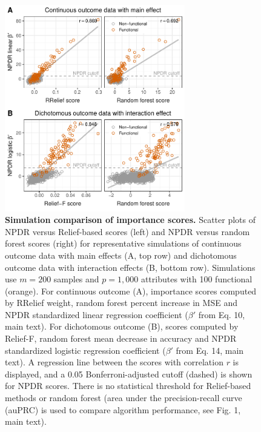 \documentclass{article}
\begin{document}
\begin{figure}[!tbp]
\centerline{\includegraphics[trim = 0 0 0 0, width=0.7\textwidth]{../figs/fig1.pdf}}
\caption{{\bf Simulation comparison of importance scores.} Scatter plots of NPDR versus Relief-based scores (left) and NPDR versus random forest scores (right) for representative simulations of continuous outcome data with main effects (A, top row) and dichotomous outcome data with interaction effects (B, bottom row). Simulations use $m = 200$ samples and $p = 1,000$ attributes with 100 functional (orange). For continuous outcome (A), importance scores computed by RRelief weight, random forest percent increase in MSE and NPDR standardized linear regression coefficient ($\beta'$ from Eq. 10, main text). For dichotomous outcome (B), scores computed by Relief-F, random forest mean decrease in accuracy and NPDR standardized logistic regression coefficient ($\beta'$ from Eq. 14, main text). A regression line between the scores with correlation $r$ is displayed, and a 0.05 Bonferroni-adjusted cutoff (dashed) is shown for NPDR scores. There is no statistical threshold for Relief-based methods or random forest (area under the precision-recall curve (auPRC) is used to compare algorithm performance, see Fig. 1, main text).}
\label{fig:npdr_relief}
\end{figure}
\end{document}
